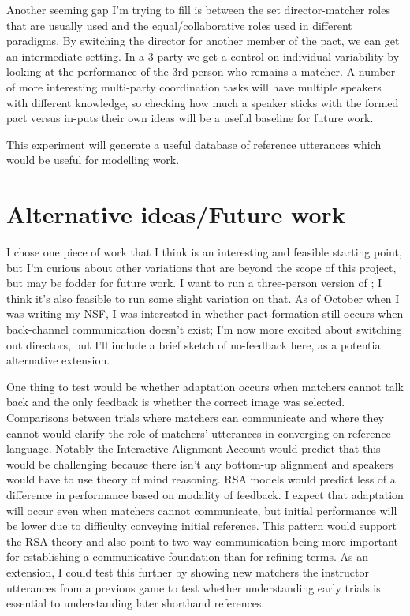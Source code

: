 \documentclass[11pt]{article}
\begin{document}
Another seeming gap I'm trying to fill is between the set director-matcher roles that are usually used and the equal/collaborative roles used in different paradigms. By switching the director for another member of the pact, we can get an intermediate setting. In a 3-party we get a control on individual variability by looking at the performance of the 3rd person who remains a matcher. A number of more interesting multi-party coordination tasks will have multiple speakers with different knowledge, so checking how much a speaker sticks with the formed pact versus in-puts their own ideas will be a useful baseline for future work. 

This experiment will generate a useful database of reference utterances which would be useful for modelling work. 

\section{Alternative ideas/Future work}
I chose one piece of work that I think is an interesting and feasible starting point, but I'm curious about other variations that are beyond the scope of this project, but may be fodder for future work. I want to run a three-person version of \cite{hawkinsCharacterizingDynamicsLearning2020}; I think it's also feasible to run some slight variation on that. As of October when I was writing my NSF, I was interested in whether pact formation still occurs when back-channel communication doesn't exist; I'm now more excited about switching out directors, but I'll include a brief sketch of no-feedback here, as a potential alternative extension. 

One thing to test would be whether adaptation occurs when matchers cannot talk back and the only feedback is whether the correct image was selected. Comparisons between trials where matchers can communicate and where they cannot would clarify the role of matchers' utterances in converging on reference language. Notably the Interactive Alignment Account would predict that this would be challenging because there isn't any bottom-up alignment and speakers would have to use theory of mind reasoning. RSA models would predict less of a difference in performance based on modality of feedback. I expect that adaptation will occur even when matchers cannot communicate, but initial performance will be lower due to difficulty conveying initial reference. This pattern would support the RSA theory and also point to two-way communication being more important for establishing a communicative foundation than for refining terms. As an extension, I could test this further by showing new matchers the instructor utterances from a previous game to test whether understanding early trials is essential to understanding later shorthand references. 
\end{document}
